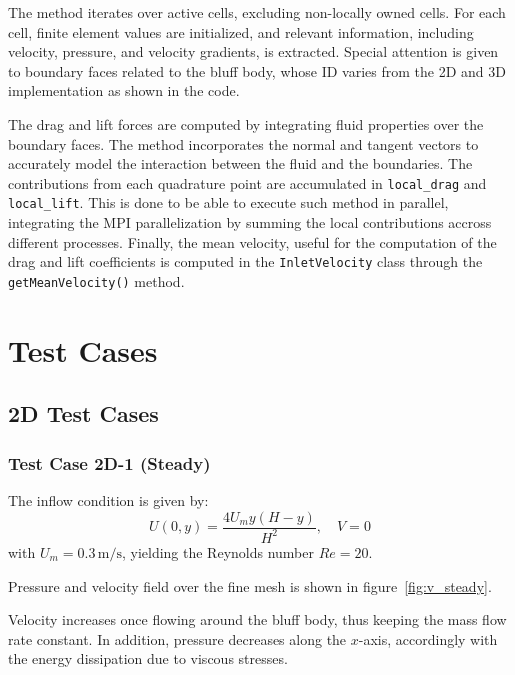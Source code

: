 \documentclass{article}
\begin{document}
The method iterates over active cells, excluding non-locally owned cells. For each cell, finite element values are initialized, and relevant information, including velocity, pressure, and velocity gradients, is extracted. Special attention is given to boundary faces related to the bluff body, whose ID varies from the 2D and 3D implementation as shown in the code.

The drag and lift forces are computed by integrating fluid properties over the boundary faces. The method incorporates the normal and tangent vectors to accurately model the interaction between the fluid and the boundaries. The contributions from each quadrature point are accumulated in \texttt{local\_drag} and \texttt{local\_lift}. This is done to be able to execute such method in parallel, integrating the MPI parallelization by summing the local contributions accross different processes.
Finally, the mean velocity, useful for the computation of the drag and lift coefficients is computed in the \texttt{InletVelocity} class through the \texttt{getMeanVelocity()} method.

\newpage


\section{Test Cases}
\subsection{2D Test Cases}
\subsubsection{Test Case 2D-1 (Steady)}

The inflow condition is given by:
\[
U(0, y) = \frac{4U_m y (H - y)}{H^2}, \quad V = 0
\]
with \(U_m = 0.3 \, \text{m/s}\), yielding the Reynolds number \(Re = 20\). 

Pressure and velocity field over the fine mesh is shown in figure~\ref{fig:v_steady}.

\begin{figure}[H]
    \centering    
    \hfill
\end{figure}

Velocity increases once flowing around the bluff body, thus keeping the mass flow rate constant. In addition, pressure decreases along the \(x\)-axis, accordingly with the energy dissipation due to viscous stresses.
\end{document}
